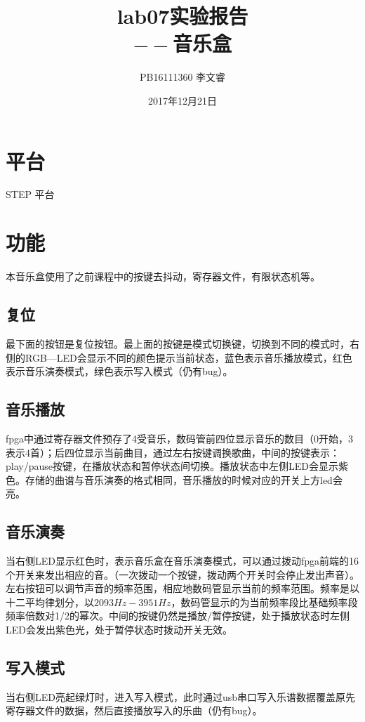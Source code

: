 \documentclass{ctexart}
\begin{document}
\title{%
	lab07实验报告 \\
	\large{$--$音乐盒}}
	\author{PB16111360 李文睿}
	\date{2017年12月21日}
	\maketitle
	\tableofcontents
	\section{平台}
	STEP 平台
	\section{功能}
	本音乐盒使用了之前课程中的按键去抖动，寄存器文件，有限状态机等。
	\subsection{复位}
	最下面的按钮是复位按钮。最上面的按键是模式切换键，切换到不同的模式时，右侧的RGB—LED会显示不同的颜色提示当前状态，蓝色表示音乐播放模式，红色表示音乐演奏模式，绿色表示写入模式（仍有bug）。
	\subsection{音乐播放}
	fpga中通过寄存器文件预存了4受音乐，数码管前四位显示音乐的数目（0开始，3表示4首）；后四位显示当前曲目，通过左右按键调换歌曲，中间的按键表示：play/pause按键，在播放状态和暂停状态间切换。播放状态中左侧LED会显示紫色。存储的曲谱与音乐演奏的格式相同，音乐播放的时候对应的开关上方led会亮。
	\subsection{音乐演奏}
	当右侧LED显示红色时，表示音乐盒在音乐演奏模式，可以通过拨动fpga前端的16个开关来发出相应的音。（一次拨动一个按键，拨动两个开关时会停止发出声音）。左右按钮可以调节声音的频率范围，相应地数码管显示当前的频率范围。频率是以十二平均律划分，以$2093Hz - 3951Hz$，数码管显示的为当前频率段比基础频率段频率倍数对1/2的幂次。中间的按键仍然是播放/暂停按键，处于播放状态时左侧LED会发出紫色光，处于暂停状态时拨动开关无效。
	\subsection{写入模式}
	当右侧LED亮起绿灯时，进入写入模式，此时通过usb串口写入乐谱数据覆盖原先寄存器文件的数据，然后直接播放写入的乐曲（仍有bug）。
\end{document}
